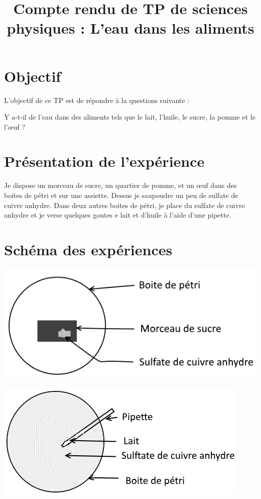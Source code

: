 \documentclass[12pt,a4paper]{article}
\title{Compte rendu de TP de sciences physiques : L'eau dans les aliments}
\date{}
\begin{document}
	
\maketitle

\section{Objectif}	
	L'objectif de ce TP est de répondre à la questions suivante :
	
	Y a-t-il de l'eau dans des aliments tels que le lait, l'huile, le sucre, la pomme et le l'\oe uf ?




\section{Présentation de l'expérience}

Je dispose un morceau de sucre, un quartier de pomme, et un \oe uf dans des boites de pétri et sur une assiette. Dessus je saupoudre un peu de sulfate de cuivre anhydre. Dans deux autres boites de pétri, je place du sulfate de cuivre anhydre et je verse quelques goutes e lait et d'huile à l'aide d'une pipette.

\section{Schéma des expériences}

\begin{multicols}{2}
	\begin{center}
		\includegraphics[scale=0.5]{sucre}
	\end{center}

	\begin{center}
		\includegraphics[scale=0.5]{lait}
	\end{center}
\end{multicols}
\end{document}
